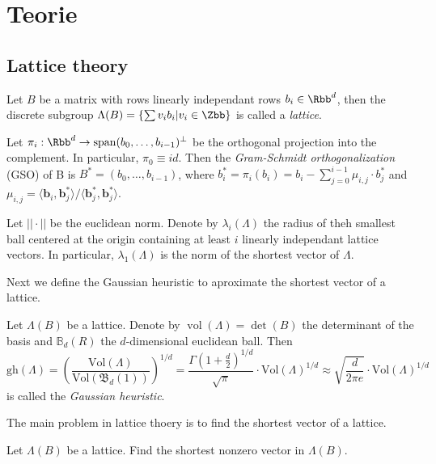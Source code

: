 \chapter{Teorie}

\section{Lattice theory}
\begin{definition}
    Let $B$ be a matrix with rows linearly independant rows $b_i \in \Rbb^d$, then the discrete subgroup $\Lambda(B) = \{\sum v_i b_i | v_i \in \Zbb\}$ is called a \textit{lattice}.   
\end{definition}

Let $\pi_i : \Rbb^d \to \operatorname{span}(b_0, \ldots, b_{i-1})^\perp$ be the orthogonal projection into the complement. In particular, $\pi_0 \equiv id$. Then the \textit{Gram-Schmidt orthogonalization} (GSO) of B is $B^* = (b_0, \ldots, b_{i-1})$, where $b^*_i = \pi_i(b_i) = b_i - \sum_{j=0}^{i-1} \mu_{i,j} \cdot b_j^*$ and $\mu_{i,j} = \langle \boldsymbol{b}_i, \boldsymbol{b}_j^* \rangle / \langle \boldsymbol{b}_j^*, \boldsymbol{b}_j^* \rangle$. 

Let $|| \cdot ||$ be the euclidean norm. Denote by $\lambda_i(\Lambda)$ the radius of theh smallest ball centered at the origin containing at least $i$ linearly independant lattice vectors. In particular, $\lambda_1(\Lambda)$ is the norm of the shortest vector of $\Lambda$.

Next we define the Gaussian heuristic to aproximate the shortest vector of a lattice.

\begin{definition}
    Let $\Lambda(B)$ be a lattice. Denote by $\operatorname*{vol}(\Lambda) = \operatorname*{det}(B)$ the determinant of the basis and $\mathbb{B}_d(R)$ the $d$-dimensional euclidean ball. Then 
    \begin{equation*}
        \mathrm{gh}(\Lambda) = \left(\frac{\mathrm{Vol}(\Lambda)}{\mathrm{Vol}(\mathfrak{B}_d(1))}\right)^{1/d} = \frac{\Gamma\left(1+\frac{d}{2}\right)^{1/d}}{\sqrt{\pi}} \cdot \mathrm{Vol}(\Lambda)^{1/d} \approx \sqrt{\frac{d}{2\pi e}} \cdot \mathrm{Vol}(\Lambda)^{1/d}
    \end{equation*}
    is called the \textit{Gaussian heuristic}.
\end{definition}

The main problem in lattice thoery is to find the shortest vector of a lattice.

\begin{definition}
    Let $\Lambda(B)$ be a lattice. Find the shortest nonzero vector in $\Lambda(B)$.
\end{definition}


